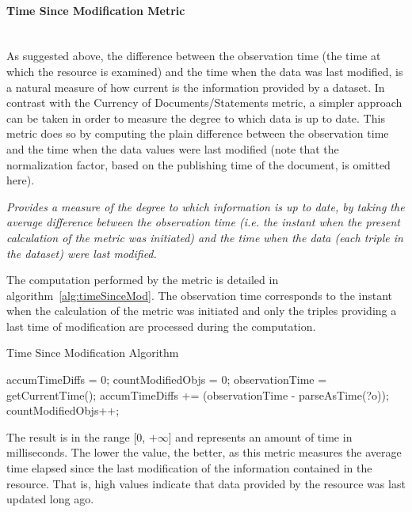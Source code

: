 \paragraph{Time Since Modification Metric}~\\ %
As suggested above, the difference between the observation time (the time at which the resource is examined) and the time when the data was last modified, is a natural measure of how current is the information provided by a dataset. In contrast with the Currency of Documents/Statements metric, a simpler approach can be taken in order to measure the degree to which data is up to date. This metric does so by computing the plain difference between the observation time and the time when the data values were last modified (note that the normalization factor, based on the publishing time of the document, is omitted here).
\begin{mdframed}[style=metricdefinition]
\emph{Provides a measure of the degree to which information is up to date, by taking the average difference between the observation time (i.e. the instant when the present calculation of the metric was initiated) and the time when the data (each triple in the dataset) were last modified.}
\end{mdframed}

The computation performed by the metric is detailed in algorithm~\ref{alg:timeSinceMod}. The observation time corresponds to the instant when the calculation of the metric was initiated and only the triples providing a last time of modification are processed during the computation.
\begin{algorithm}
\caption{Time Since Modification Algorithm} \label{alg:timeSinceMod}
\begin{algorithmic}[1]
\State accumTimeDiffs = 0;
\State countModifiedObjs = 0;
\State observationTime = getCurrentTime();
\EndProcedure
{}
\State accumTimeDiffs += (observationTime - parseAsTime(?o));
\State countModifiedObjs++;
\EndIf ~\\
\EndProcedure
\end{algorithmic}
\end{algorithm}
The result is in the range [0, $+\infty$] and represents an amount of time in milliseconds. The lower the value, the better, as this metric measures the average time elapsed since the last modification of the information contained in the resource. That is, high values indicate that data provided by the resource was last updated long ago.

